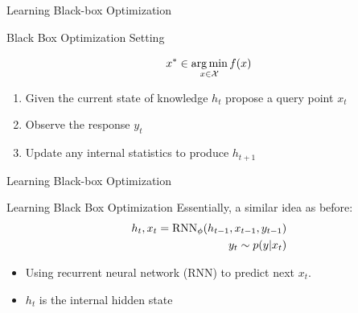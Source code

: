\begin{frame}[c]{Learning Black-box Optimization~}

\begin{block}{Black Box Optimization Setting}

\begin{equation}
x^* \in \operatorname*{arg\,min}_{x \in \mathcal{X}} f(x) \nonumber
\end{equation}
	
\begin{enumerate}
\item Given the current state of knowledge $h_t$ propose a query point $x_t$
\item Observe the response $y_t$
\item Update any internal statistics to produce $h_{t+1}$
\end{enumerate}
\end{block}


\end{frame}
\begin{frame}[c]{Learning Black-box Optimization~}


\begin{block}{Learning Black Box Optimization}
	Essentially, a similar idea as before:
	\begin{eqnarray}
	h_t, x_t = \text{RNN}_\phi(h_{t-1}, x_{t-1}, y_{t-1}) \nonumber \\
	y_t \sim p(y|x_t)\nonumber
	\end{eqnarray}
	
	\begin{itemize}
		\item Using recurrent neural network (RNN) to predict next $x_t$.
		\item $h_t$ is the internal hidden state 
	\end{itemize}
	
\end{block}



\end{frame}
